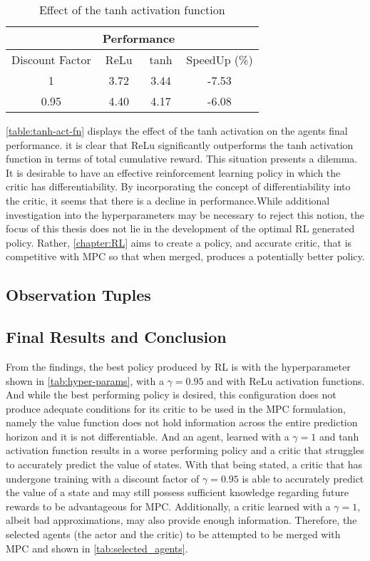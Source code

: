 \begin{table}[h!]
\centering
\begin{tabular}{|c|c|c|c|}
\hline
   & \multicolumn{2}{c|}{Performance} & \\
   \hline
  Discount Factor & ReLu & tanh & SpeedUp (\%) \\
\hline
  1   & 3.72 & 3.44 & -7.53 \\
\hline
0.95 & 4.40& 4.17& -6.08 \\
\hline
\end{tabular}
\caption{Effect of the tanh activation function}
\label{table:tanh-act-fn}
\end{table}

\autoref{table:tanh-act-fn} displays the effect of the tanh activation on the agents final performance. it is clear that ReLu significantly outperforms the tanh activation function in terms of total cumulative reward. This situation presents a dilemma. It is desirable to have an effective reinforcement learning policy in which the critic has differentiability. By incorporating the concept of differentiability into the critic, it seems that there is a decline in performance.While additional investigation into the hyperparameters may be necessary to reject this notion,  the focus of this thesis does not lie in the development of the optimal RL generated policy. Rather, \autoref{chapter:RL} aims to create a policy, and accurate critic, that is competitive with MPC so that when merged, produces a potentially better policy.

\subsection{Observation Tuples}


\subsection{Final Results and Conclusion}
\label{section:rl-deterministic-results}
From the findings, the best policy produced by RL is with the hyperparameter shown in \autoref{tab:hyper-params}, with a $\gamma = 0.95$ and with ReLu activation functions. And while the best performing policy is desired, this configuration does not produce adequate conditions for its critic to be used in the MPC formulation, namely the value function does not hold information across the entire prediction horizon and it is not differentiable. And an agent, learned with a $\gamma = 1$ and tanh activation function results in a worse performing policy and a critic that struggles to accurately predict the value of states. With that being stated, a critic that has undergone training with a discount factor of $\gamma = 0.95$ is able to accurately predict the value of a state and may still possess sufficient knowledge regarding future rewards to be advantageous for MPC. Additionally, a critic learned with a $\gamma = 1$, albeit bad approximations, may also provide enough information. Therefore, the selected agents (the actor and the critic) to be attempted to be merged with MPC and shown in \autoref{tab:selected_agents}. 


